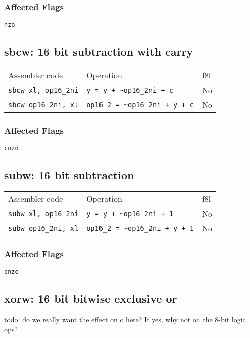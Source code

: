 \documentclass{book}
\begin{document}
\subsubsection*{Affected Flags}

\texttt{nzo}


\subsection{sbcw: 16 bit subtraction with carry}

\begin{tabular}{l l l}
Assembler code              & Operation                             & f8l \\
\texttt{sbcw xl, op16\_2ni} & \texttt{y = y + \~{}op16\_2ni + c}       & No \\
\texttt{sbcw op16\_2ni, xl} & \texttt{op16\_2 = \~{}op16\_2ni + y + c} & No
\end{tabular}

\subsubsection*{Affected Flags}

\texttt{cnzo}


\subsection{subw: 16 bit subtraction}

\begin{tabular}{l l l}
Assembler code              & Operation                             & f8l \\
\texttt{subw xl, op16\_2ni} & \texttt{y = y + \~{}op16\_2ni + 1}       & No \\
\texttt{subw op16\_2ni, xl} & \texttt{op16\_2 = \~{}op16\_2ni + y + 1} & No
\end{tabular}

\subsubsection*{Affected Flags}

\texttt{cnzo}


\subsection{xorw: 16 bit bitwise exclusive or}

todo: do we really want the effect on o here? If yes, why not on the 8-bit logic ops?
\end{document}
